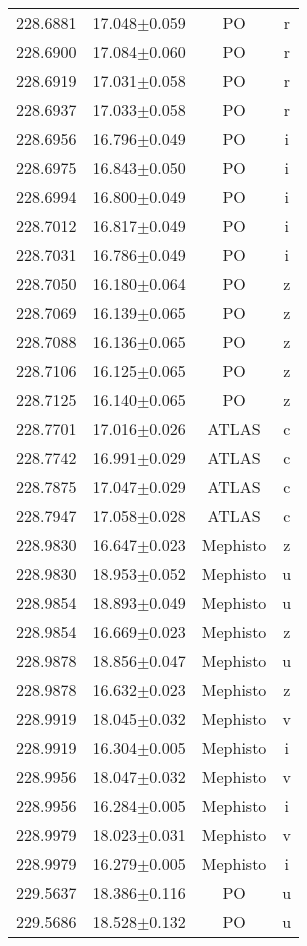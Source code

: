 \begin{table}
\begin{tabular}{cccc}
228.6881 & 17.048$\pm$0.059 & PO & r \\
228.6900 & 17.084$\pm$0.060 & PO & r \\
228.6919 & 17.031$\pm$0.058 & PO & r \\
228.6937 & 17.033$\pm$0.058 & PO & r \\
228.6956 & 16.796$\pm$0.049 & PO & i \\
228.6975 & 16.843$\pm$0.050 & PO & i \\
228.6994 & 16.800$\pm$0.049 & PO & i \\
228.7012 & 16.817$\pm$0.049 & PO & i \\
228.7031 & 16.786$\pm$0.049 & PO & i \\
228.7050 & 16.180$\pm$0.064 & PO & z \\
228.7069 & 16.139$\pm$0.065 & PO & z \\
228.7088 & 16.136$\pm$0.065 & PO & z \\
228.7106 & 16.125$\pm$0.065 & PO & z \\
228.7125 & 16.140$\pm$0.065 & PO & z \\
228.7701 & 17.016$\pm$0.026 & ATLAS & c \\
228.7742 & 16.991$\pm$0.029 & ATLAS & c \\
228.7875 & 17.047$\pm$0.029 & ATLAS & c \\
228.7947 & 17.058$\pm$0.028 & ATLAS & c \\
228.9830 & 16.647$\pm$0.023 & Mephisto & z \\
228.9830 & 18.953$\pm$0.052 & Mephisto & u \\
228.9854 & 18.893$\pm$0.049 & Mephisto & u \\
228.9854 & 16.669$\pm$0.023 & Mephisto & z \\
228.9878 & 18.856$\pm$0.047 & Mephisto & u \\
228.9878 & 16.632$\pm$0.023 & Mephisto & z \\
228.9919 & 18.045$\pm$0.032 & Mephisto & v \\
228.9919 & 16.304$\pm$0.005 & Mephisto & i \\
228.9956 & 18.047$\pm$0.032 & Mephisto & v \\
228.9956 & 16.284$\pm$0.005 & Mephisto & i \\
228.9979 & 18.023$\pm$0.031 & Mephisto & v \\
228.9979 & 16.279$\pm$0.005 & Mephisto & i \\
229.5637 & 18.386$\pm$0.116 & PO & u \\
229.5686 & 18.528$\pm$0.132 & PO & u \\

\end{tabular}
\end{table}
